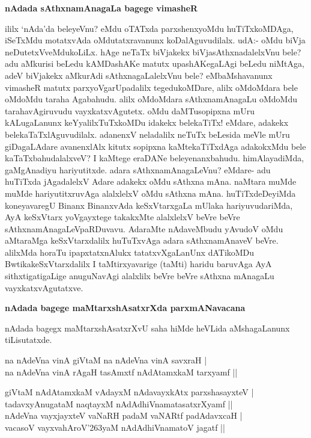 {\bigskip
\noindent
{\large\bf nAdada sAthxnamAnagaLa bagege vimasheR}}\label{page158}
\medskip

\noindent
ililx `nAda'da beleyeVnu? eMdu oTATxda parxshenxyoMdu huTiTxkoMDAga, iSeTxMdu motatxvAda oMdutatxravanunx koDalAguvudilalx. udA:- oMdu biVja neDutetxVveMdukoLiLx. hAge neTaTx biVjakekx biVja\-sAthxnadalelxVnu bele? adu aMkurisi beLedu kAMDashAKe matutx upashAKegaLAgi beLedu niMtAga,\- adeV biVjakekx aMkurAdi sAthxnagaLalelxVnu bele? eMbaMshavanunx vimasheR matutx parxyoVgarUpadalilx tegedu\-koMDare, alilx oMdoMdara bele oMdoMdu taraha Agabahudu. alilx oMdoMdara sAthxnamAna\-gaLu oMdoMdu tarahavAgiruvudu vayxkatxvAgutetx. oMdu daMTusopipxna mUru kALugaLanunx keYyalilxTuTx\-koMDu idakekx belekaTiTx! eMdare, adakekx belekaTaTxlAguvudilalx. adanenxV neladalilx neTuTx beLesida meVle mUru giDagaLAdare avanenxlAlx kitutx sopipxna kaMtekaTiTxdAga adakokxMdu bele kaTaTxbahudalalxveV? I kaMtege eraDANe beleyenanxbahudu. himAlayadiMda, gaMgAnadiyu hariyutitxde. adara sAthxnamAna\-gaLeVnu? eMdare- adu huTiTxda jAgadalelxV Adare adakekx oMdu sAthxna mAna. naMtara muMde muMde hariyutitxruvAga alalxlelxV oMdu sAthxna mAna. huTiTxdeDeyiMda koneyavaregU Binanx BinanxvAda keSxVtarx\-gaLa mUlaka hariyuvudariMda, AyA keSxVtarx yoVgayxtege takakxMte alalxlelxV beVre beVre sAthxnamAna\-gaLeVpaRDu\-vavu. AdaraMte nAdaveMbudu yAvudoV oMdu aMtaraMga keSxVtarxdalilx huTuTxvAga adara sAthxna\-mAnaveV beVre. alilxMda horaTu ipapxtatxnAlukx tatatxvXgaLanUnx dATikoMDu BwtikakeSxVtarxdalilx I taMtirxyavarige (taMti) haridu baruvAga AyA sithxtigatigaLige anuguNavAgi alalxlilx beVre beVre sAthxna mAnagaLu vayxkatx\-vAgutatxve.

{\bigskip
\noindent
{\large\bf nAdada bagege maMtarxshAsatxrXda parxmANavacana}}\label{page159}
\medskip

\noindent
nAdada bagegx maMtarxshAsatxrXvU saha hiMde heVLida aMshagaLanunx tiLisutatxde.

\begin{shloka}
na nAdeVna vinA giVtaM na nAdeVna vinA savxraH |\\\label{159}
na nAdeVna vinA rAgaH tasAmxtf nAdAtamxkaM tarxyamf ||
\end{shloka}

\begin{shloka}
giVtaM nAdAtamxkaM vAdayxM nAdavayxkAtx parxshasayxteV |\\\label{159}
tadavxyAnugataM naqtayxM nAdAdhiVnamatasatxrXyamf ||\\
nAdeVna vayxjayxteV vaNaRH padaM vaNARtf padAdavxcaH |\\
vacasoV vayxvahAroV\char'263yaM nAdAdhiVnamatoV jagatf ||
\end{shloka}

